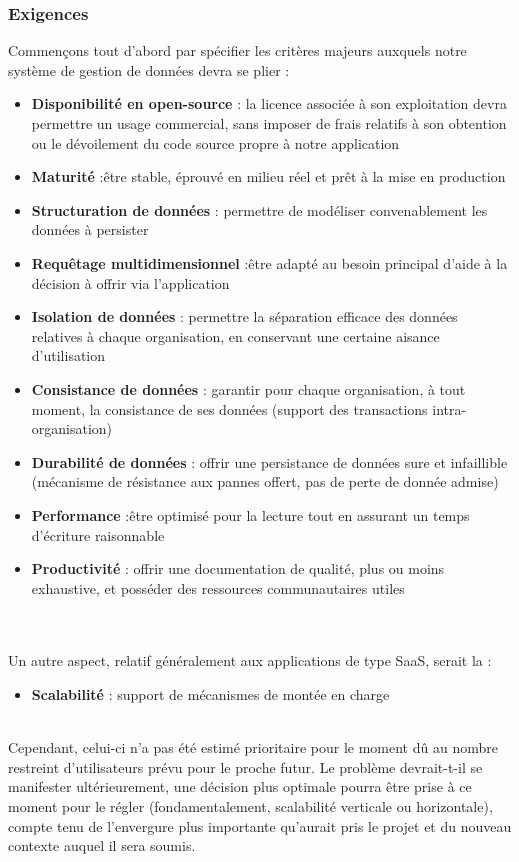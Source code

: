 \begin{spacing}{1.5}
\subsubsection{Exigences}%
Commençons tout d’abord par spécifier les critères majeurs auxquels notre système de gestion de données devra se plier :
\begin{itemize}
	\item \textbf{Disponibilité en open-source} : la licence associée à son exploitation devra permettre un usage commercial, sans imposer de frais relatifs à son obtention ou le dévoilement du code source propre à notre application
	\item \textbf{Maturité} :être stable, éprouvé en milieu réel et prêt à la mise en production
	\item \textbf{Structuration de données} : permettre de modéliser convenablement les données à persister
	\item \textbf{Requêtage multidimensionnel} :être adapté au besoin principal d’aide à la décision à offrir via l’application
	\item \textbf{Isolation de données} : permettre la séparation efficace des données relatives à chaque organisation, en conservant une certaine aisance d’utilisation
	\item \textbf{Consistance de données} : garantir pour chaque organisation, à tout moment, la consistance de ses données (support des transactions intra-organisation)
	\item \textbf{Durabilité de données} : offrir une persistance de données sure et infaillible (mécanisme de résistance aux pannes offert, pas de perte de donnée admise)
	\item \textbf{Performance} :être optimisé pour la lecture tout en assurant un temps d’écriture raisonnable
	\item \textbf{Productivité} : offrir une documentation de qualité, plus ou moins exhaustive, et posséder des ressources communautaires utiles
\end{itemize}
\\
\\
Un autre aspect, relatif généralement aux applications de type SaaS, serait la :
\begin{itemize}
	\item \textbf{Scalabilité} : support de mécanismes de montée en charge
\end{itemize}
\\
Cependant, celui-ci n’a pas été estimé prioritaire pour le moment dû au nombre restreint d’utilisateurs prévu pour le proche futur. 
Le problème devrait-t-il se manifester ultérieurement, une décision plus optimale pourra être prise à ce moment pour le régler (fondamentalement, scalabilité verticale ou horizontale), compte tenu de l’envergure plus importante qu’aurait pris le projet et du nouveau contexte auquel il sera soumis.


\end{spacing}
